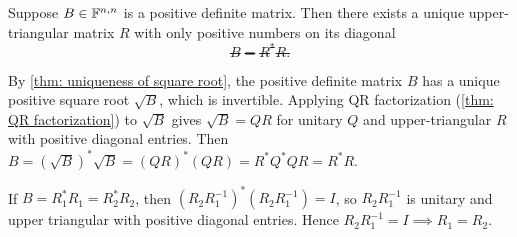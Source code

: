 \begin{thm}
  \label{thm: cholesky factorization}
  Suppose $B \in \mathbb{F}^{n,n}$ is a positive definite matrix. Then there exists a unique upper-triangular matrix $R$ with only positive numbers on its diagonal \st
  \begin{equation}
    B = R^*R.
  \end{equation}
\end{thm}
\begin{prf}
   By \ref{thm: uniqueness of square root}, the positive definite matrix $B$ has a unique positive square root $\sqrt{B}$, which is invertible.
  Applying QR factorization (\ref{thm: QR factorization}) to $\sqrt{B}$ gives $\sqrt{B} = QR$ for unitary $Q$ and upper-triangular $R$ with positive diagonal entries.
  Then $B = (\sqrt{B})^* \sqrt{B} = (QR)^* (QR) = R^* Q^* Q R = R^* R$.

   If $B = R_1^* R_1 = R_2^* R_2$, then $(R_2 R_1^{-1})^* (R_2 R_1^{-1}) = I$, so $R_2 R_1^{-1}$ is unitary and upper triangular with positive diagonal entries. Hence $R_2 R_1^{-1} = I \implies R_1 = R_2$.
\end{prf}

